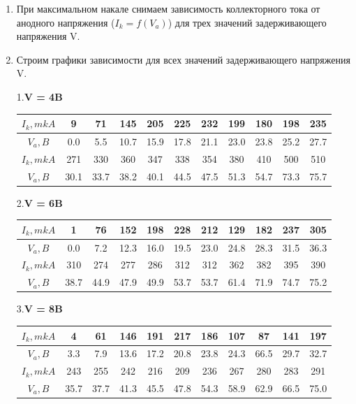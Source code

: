 \documentclass[a4paper,12pt]{article}
\begin{document}
 
 \begin{enumerate}
\item При максимальном накале снимаем зависимость коллекторного тока от анодного напряжения ($I_k = f(V_a)$) для трех значений задерживающего напряжения V.

\item Строим графики зависимости для всех значений задерживающего напряжения V.

1.\textbf{V = 4B}

  \begin{table}[H]
\begin{center}
\begin{tabular}{|c|c|c|c|c|c|c|c|c|c|c|}
\hline $I_k , mkA $&9&71&145&205&225&232&199&180&198&235\\
\hline $V_a , B$&0.0&5.5&10.7&15.9&17.8&21.1&23.0&23.8&25.2&27.7\\
\hline $I_k , mkA $&271&330&360&347&338&354&380&410&500&510\\
\hline $V_a , B$&30.1&33.7&38.2&40.1&44.5&47.5&51.3&54.7&73.3&75.7\\
\hline
\end{tabular}
\end{center}
\end{table}


2.\textbf{V = 6B}

  \begin{table}[H]
\begin{center}
\begin{tabular}{|c|c|c|c|c|c|c|c|c|c|c|}
\hline $I_k , mkA $&1&76&152&198&228&212&129&182&237&305\\
\hline $V_a , B$&0.0&7.2&12.3&16.0&19.5&23.0&24.8&28.3&31.5&36.3\\
\hline $I_k , mkA $&310&274&277&286&312&312&362&382&395&390\\
\hline $V_a , B$&38.7&44.9&47.9&49.9&53.7&53.7&61.4&71.9&74.7&75.2\\
\hline
\end{tabular}
\end{center}
\end{table}


3.\textbf{V = 8B}


  \begin{table}[H]
\begin{center}
\begin{tabular}{|c|c|c|c|c|c|c|c|c|c|c|}
\hline $I_k , mkA $&4&61&146&191&217&186&107&87&141&197\\
\hline $V_a , B$&3.3&7.9&13.6&17.2&20.8&23.8&24.3&66.5&29.7&32.7\\
\hline $I_k , mkA $&243&255&242&216&209&236&267&280&283&291\\
\hline $V_a , B$&35.7&37.7&41.3&45.5&47.8&54.3&58.9&62.9&66.5&75.0\\
\hline
\end{tabular}
\end{center}
\end{table}


\end{enumerate}
\end{document}
